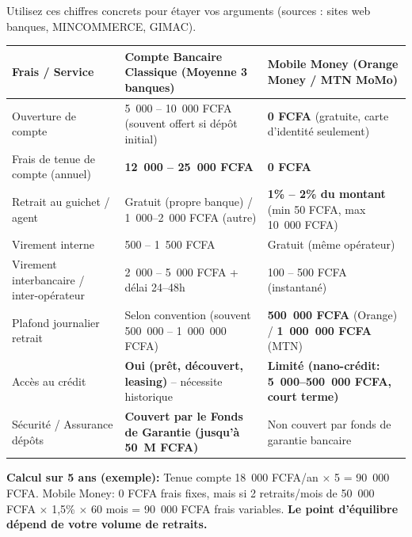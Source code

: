 \documentclass[11pt]{article}
\begin{document}
\begin{exemplebox}
Utilisez ces chiffres concrets pour étayer vos arguments (sources : sites web banques, MINCOMMERCE, GIMAC).
\begin{center}
\begin{tabularx}{\linewidth}{|l|X|X|}\hline
\textbf{Frais / Service} & \textbf{Compte Bancaire Classique (Moyenne 3 banques)} & \textbf{Mobile Money (Orange Money / MTN MoMo)} \\\hline
Ouverture de compte & 5~000 -- 10~000 FCFA (souvent offert si dépôt initial) & \textbf{0 FCFA} (gratuite, carte d'identité seulement) \\\hline
Frais de tenue de compte (annuel) & \textbf{12~000 -- 25~000 FCFA} & \textbf{0 FCFA} \\\hline
Retrait au guichet / agent & Gratuit (propre banque) / 1~000--2~000 FCFA (autre) & \textbf{1\% -- 2\% du montant} (min 50 FCFA, max 10~000 FCFA) \\\hline
Virement interne & 500 -- 1~500 FCFA & Gratuit (même opérateur) \\\hline
Virement interbancaire / inter-opérateur & 2~000 -- 5~000 FCFA + délai 24--48h & 100 -- 500 FCFA (instantané) \\\hline
Plafond journalier retrait & Selon convention (souvent 500~000 -- 1~000~000 FCFA) & \textbf{500~000 FCFA} (Orange) / \textbf{1~000~000 FCFA} (MTN) \\\hline
Accès au crédit & \textbf{Oui (prêt, découvert, leasing)} -- nécessite historique & \textbf{Limité (nano-crédit: 5~000--500~000 FCFA, court terme)} \\\hline
Sécurité / Assurance dépôts & \textbf{Couvert par le Fonds de Garantie (jusqu'à 50~M FCFA)} & Non couvert par fonds de garantie bancaire \\\hline
\end{tabularx}
\end{center}
\textbf{Calcul sur 5 ans (exemple):} Tenue compte 18~000 FCFA/an $\times$ 5 = 90~000 FCFA. Mobile Money: 0 FCFA frais fixes, mais si 2 retraits/mois de 50~000 FCFA $\times$ 1,5\% $\times$ 60 mois = 90~000 FCFA frais variables. \textbf{Le point d'équilibre dépend de votre volume de retraits.}
\end{exemplebox}
\end{document}

